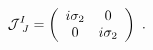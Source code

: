 \begin{equation}
{\cal J}^I_{~J}=
\left(
\begin{array}{cc}
i\sigma_2 & 0 \\
0         & i\sigma_2 
\end{array}
\right) \ .
\end{equation}

